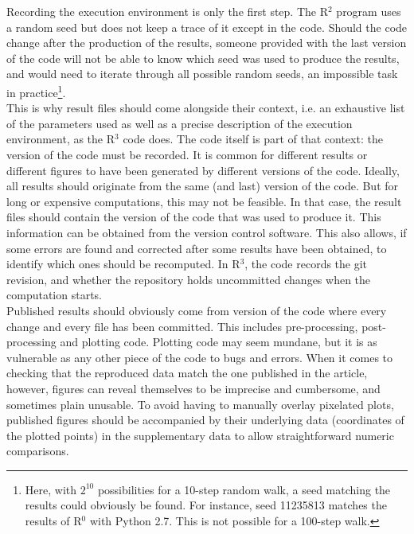 \documentclass[a4paper,11pt]{article}
\begin{document}
Recording the execution environment is only the first step. The R$^2$ program uses a random seed but does not keep a trace of it except in the code. Should the code change after the production of the results, someone provided with the last version of the code will not be able to know which seed was used to produce the results, and would need to iterate through all possible random seeds, an impossible task in practice\footnote{Here, with $2^{10}$ possibilities for a 10-step random walk, a seed matching the results could obviously be found. For instance, seed 11235813 matches the results of R$^0$ with Python 2.7. This is not possible for a 100-step walk.}.\\

This is why result files should come alongside their context, i.e. an exhaustive list of the parameters used as well as a precise description of the execution environment, as the R$^3$ code does. The code itself is part of that context: the version of the code must be recorded. It is common for different results or different figures to have been generated by different versions of the code. Ideally, all results should originate from the same (and last) version of the code. But for long or expensive computations, this may not be feasible. In that case, the result files should contain the version of the code that was used to produce it. This information can be obtained from the version control software. This also allows, if some errors are found and corrected after some results have been obtained, to identify which ones should be recomputed. In R$^3$, the code records the git revision, and whether the repository holds uncommitted changes when the computation starts.\\

Published results should obviously come from version of the code where every change and every file has been committed. This includes pre-processing, post-processing and plotting code. Plotting code may seem mundane, but it is as vulnerable as any other piece of the code to bugs and errors.
When it comes to checking that the reproduced data match the one published in the article, however, figures can reveal themselves to be imprecise and cumbersome, and sometimes plain unusable. To avoid having to manually overlay pixelated plots, published figures should be accompanied by their underlying data (coordinates of the plotted points) in the supplementary data to allow straightforward numeric comparisons.\\
\end{document}
